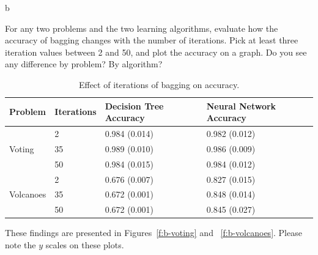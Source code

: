 \documentclass[fleqn]{homework}
\begin{document}
  \begin{problem}{b}
    \begin{question}
      For any two problems and the two learning algorithms, evaluate how the
      accuracy of bagging changes with the number of iterations. Pick at least
      three iteration values between 2 and 50, and plot the accuracy on a
      graph. Do you see any difference by problem? By algorithm?
    \end{question}

    \begin{table}[h]
      \centering
      \caption{Effect of iterations of bagging on accuracy.}
      \label{t:b}
      \begin{tabular}{ll|ll}
        \toprule
        Problem   & Iterations & Decision Tree Accuracy & Neural Network Accuracy \\
        \midrule
                  & 2          & 0.984 (0.014)          & 0.982 (0.012)            \\
        Voting    & 35         & 0.989 (0.010)          & 0.986 (0.009)            \\
                  & 50         & 0.984 (0.015)          & 0.984 (0.012)            \\
        \midrule
                  & 2          & 0.676 (0.007)          & 0.827 (0.015)            \\
        Volcanoes & 35         & 0.672 (0.001)          & 0.848 (0.014)            \\
                  & 50         & 0.672 (0.001)          & 0.845 (0.027)            \\
        \bottomrule
      \end{tabular}
    \end{table}

    These findings are presented in Figures~\ref{f:b-voting} and
    ~\ref{f:b-volcanoes}.  Please note the $y$ scales on these plots.


\end{problem}
\end{document}
